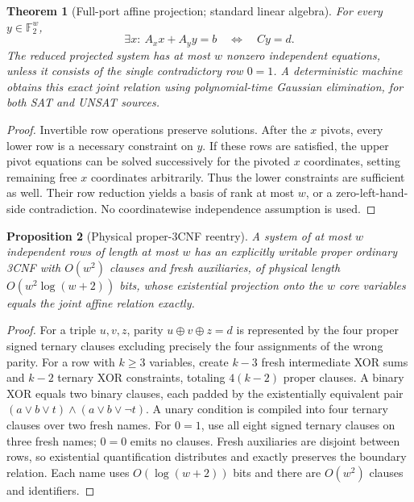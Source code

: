 \documentclass[11pt]{article}
\newtheorem{theorem}{Theorem}
\newtheorem{proposition}[theorem]{Proposition}
\begin{document}
\begin{theorem}[Full-port affine projection; standard linear algebra]
For every $y\in\mathbb F_2^w$,
\[
\boxed{\exists x:\ A_xx+A_yy=b\quad\Longleftrightarrow\quad Cy=d.}
\]
The reduced projected system has at most $w$ nonzero independent equations, unless it consists of the single contradictory row $0=1$. A deterministic machine obtains this exact joint relation using polynomial-time Gaussian elimination, for both SAT and UNSAT sources.
\end{theorem}
\begin{proof}
Invertible row operations preserve solutions. After the $x$ pivots, every lower row is a necessary constraint on $y$. If these rows are satisfied, the upper pivot equations can be solved successively for the pivoted $x$ coordinates, setting remaining free $x$ coordinates arbitrarily. Thus the lower constraints are sufficient as well. Their row reduction yields a basis of rank at most $w$, or a zero-left-hand-side contradiction. No coordinatewise independence assumption is used.
\end{proof}

\begin{proposition}[Physical proper-3CNF reentry]
A system of at most $w$ independent rows of length at most $w$ has an explicitly writable proper ordinary 3CNF with $O(w^2)$ clauses and fresh auxiliaries, of physical length $O(w^2\log(w+2))$ bits, whose existential projection onto the $w$ core variables equals the joint affine relation exactly.
\end{proposition}
\begin{proof}
For a triple $u,v,z$, parity $u\oplus v\oplus z=d$ is represented by the four proper signed ternary clauses excluding precisely the four assignments of the wrong parity. For a row with $k\ge3$ variables, create $k-3$ fresh intermediate XOR sums and $k-2$ ternary XOR constraints, totaling $4(k-2)$ proper clauses. A binary XOR equals two binary clauses, each padded by the existentially equivalent pair $(a\vee b\vee t)\wedge(a\vee b\vee\neg t)$. A unary condition is compiled into four ternary clauses over two fresh names. For $0=1$, use all eight signed ternary clauses on three fresh names; $0=0$ emits no clauses. Fresh auxiliaries are disjoint between rows, so existential quantification distributes and exactly preserves the boundary relation. Each name uses $O(\log(w+2))$ bits and there are $O(w^2)$ clauses and identifiers.
\end{proof}
\end{document}
